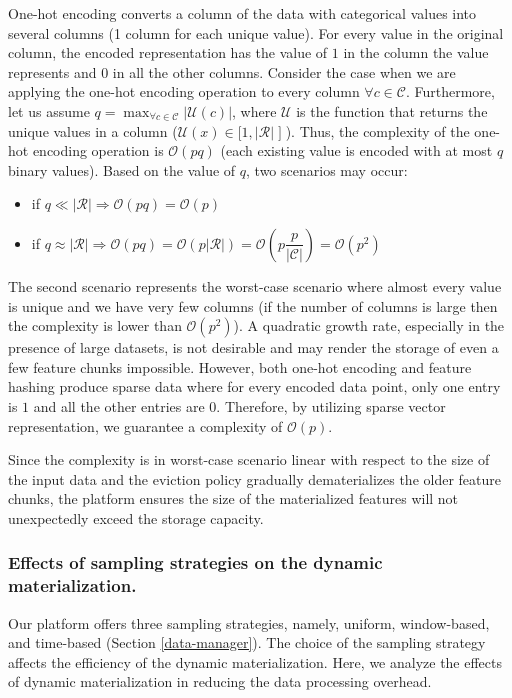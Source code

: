 One-hot encoding converts a column of the data with categorical values into several columns (1 column for each unique value).
For every value in the original column, the encoded representation has the value of $1$ in the column the value represents and $0$ in all the other columns.
Consider the case when we are applying the one-hot encoding operation to every column $\forall c \in \mathcal{C}$.
Furthermore, let us assume $q = \max_{\forall c \in \mathcal{C}} |\mathcal{U}(c)|$, where $\mathcal{U}$ is the function that returns the unique values in a column ($\mathcal{U}(x) \in [\mathopen 1, |\mathcal{R}| \mathopen ]$).
Thus, the complexity of the one-hot encoding operation is $\mathcal{O}(pq)$ (each existing value is encoded with at most $q$ binary values).
Based on the value of $q$, two scenarios may occur:
\begin{itemize}
\item if $q \ll |\mathcal{R}| \Rightarrow \mathcal{O}(pq) = \mathcal{O}(p)$
\item if $q \approx |\mathcal{R}| \Rightarrow \mathcal{O}(pq) = \mathcal{O}(p|\mathcal{R}|) = \mathcal{O}(p\dfrac{p}{|\mathcal{C}|})=\mathcal{O}(p^2)$
\end{itemize}
The second scenario represents the worst-case scenario where almost every value is unique and we have very few columns (if the number of columns is large then the complexity is lower than $\mathcal{O}(p^2)$).
A quadratic growth rate, especially in the presence of large datasets, is not desirable and may render the storage of even a few feature chunks impossible.
However, both one-hot encoding and feature hashing produce sparse data where for every encoded data point, only one entry is $1$ and all the other entries are $0$.
Therefore, by utilizing sparse vector representation, we guarantee a complexity of $\mathcal{O}(p)$.

Since the complexity is in worst-case scenario linear with respect to the size of the input data and the eviction policy gradually dematerializes the older feature chunks, the platform ensures the size of the materialized features will not unexpectedly exceed the storage capacity.

\subsubsection{Effects of sampling strategies on the dynamic materialization.}
Our platform offers three sampling strategies, namely, uniform, window-based, and time-based (Section \ref{data-manager}).
The choice of the sampling strategy affects the efficiency of the dynamic materialization.
Here, we analyze the effects of dynamic materialization in reducing the data processing overhead.


